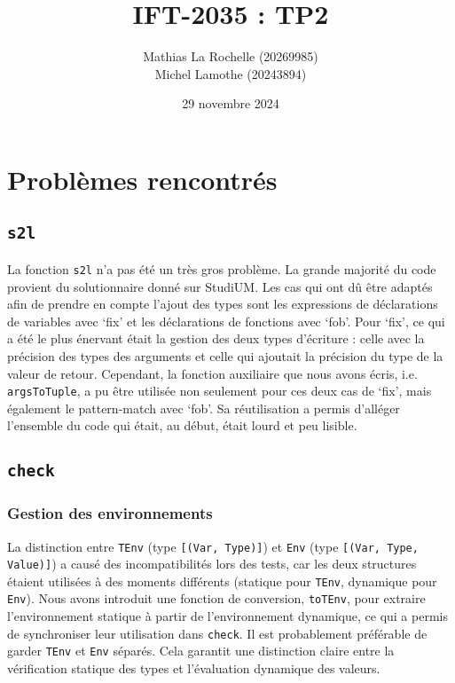 \documentclass[a4paper,12pt]{article}
\title{IFT-2035 : TP2}
\author{
    Mathias La Rochelle (20269985) \\ 
    Michel Lamothe (20243894)
}
\date{29 novembre 2024}
\begin{document}
\maketitle

\pagestyle{plain} %
\tableofcontents
{}
\pagestyle{fancy} %

\section{Problèmes rencontrés}
    \subsection{\texttt{s2l}}
        La fonction \texttt{s2l} n'a pas été un très gros problème. La grande majorité du code
        provient du solutionnaire donné sur StudiUM. Les cas qui ont dû être adaptés afin de 
        prendre en compte l'ajout des types sont les expressions de déclarations de variables
        avec `fix' et les déclarations de fonctions avec `fob'. Pour `fix', ce qui a été le 
        plus énervant était la gestion des deux types d'écriture : celle avec la précision
        des types des arguments et celle qui ajoutait la précision du type de la valeur de 
        retour. Cependant, la fonction auxiliaire que nous avons écris, i.e. \texttt{argsToTuple}, 
        a pu être utilisée non seulement pour ces deux cas de `fix', mais également le 
        pattern-match avec `fob'. Sa réutilisation a permis d'alléger l'ensemble du code qui
        était, au début, était lourd et peu lisible.
    \subsection{\texttt{check}}
    \subsubsection{Gestion des environnements}
    La distinction entre \texttt{TEnv} (type \texttt{[(Var, Type)]}) et \texttt{Env} (type \texttt{[(Var, Type, Value)]}) a causé des incompatibilités lors des tests, car les deux structures étaient utilisées à des moments différents (statique pour \texttt{TEnv}, dynamique pour \texttt{Env}). Nous avons introduit une fonction de conversion, \texttt{toTEnv}, pour extraire l’environnement statique à partir de l’environnement dynamique, ce qui a permis de synchroniser leur utilisation dans \texttt{check}. Il est probablement préférable de garder \texttt{TEnv} et \texttt{Env} séparés. Cela garantit une distinction claire entre la vérification statique des types et l'évaluation dynamique des valeurs.
\end{document}
